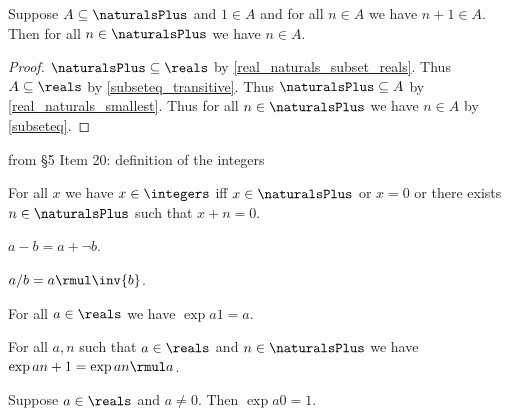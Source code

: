 \begin{theorem}\label{real_naturals_induction}
    Suppose $A\subseteq\naturalsPlus$ and $1\in A$ and for all $n\in A$ we have $n + 1\in A$.
    Then for all $n\in\naturalsPlus$ we have $n\in A$.
\end{theorem}
\begin{proof}
    $\naturalsPlus \subseteq \reals$ by \cref{real_naturals_subset_reals}.
    Thus $A\subseteq\reals$ by \cref{subseteq_transitive}.
    Thus $\naturalsPlus \subseteq A$ by \cref{real_naturals_smallest}.
    Thus for all $n\in\naturalsPlus$ we have $n\in A$ by \cref{subseteq}.
\end{proof}

from §5 Item 20: definition of the integers
\begin{axiom}\label{real_integers}
    For all $x$ we have $x\in\integers$ iff
    $x\in\naturalsPlus$ or $x=0$ or there exists $n\in\naturalsPlus$ such that $x + n = 0$.
\end{axiom}


\begin{definition}\label{real_sub}
    $a - b = a + \neg{b}$.
\end{definition}

\begin{definition}\label{real_div}
    $a / b = a \rmul \inv{b}$.
\end{definition}


\begin{axiom}\label{real_pow_one}
    For all $a\in\reals$ we have $\exp{a}{1} = a$.
\end{axiom}


\begin{axiom}\label{real_pow_succ}
    For all $a, n$ such that $a\in\reals$ and $n\in\naturalsPlus$ we have $\exp{a}{n+1} = \exp{a}{n} \rmul a$.
\end{axiom}

\begin{axiom}\label{real_pow_zero}
    Suppose $a\in\reals$ and $a\neq 0$.
    Then $\exp{a}{0} = 1$.
\end{axiom}



